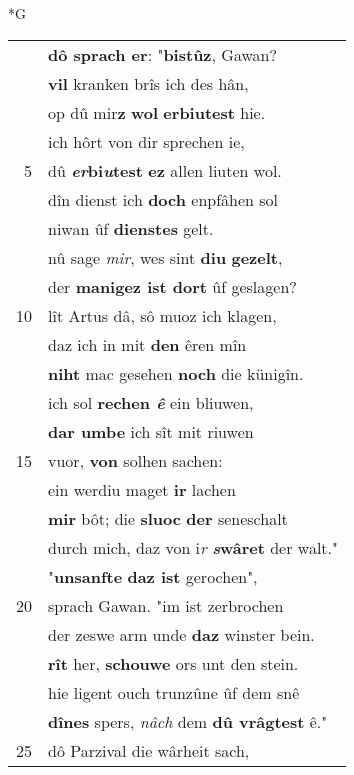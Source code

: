 \documentclass[8pt,a4paper,notitlepage]{article}
\begin{document}
\newpage
\begin{table}[ht]
\begin{minipage}[t]{0.5\linewidth}
\small
\begin{center}*G
\end{center}
\begin{tabular}{rl}
 & \textbf{dô sprach er}: "\textbf{bistûz}, Gawan?\\ 
 & \textbf{vil} kranken brîs ich des hân,\\ 
 & op dû mir\textbf{z} \textbf{wol} \textbf{erbiutest} hie.\\ 
 & ich hôrt von dir sprechen ie,\\ 
5 & dû \textbf{\textit{er}bi\textit{u}test} \textbf{ez} allen liuten wol.\\ 
 & dîn dienst ich \textbf{doch} enpfâhen sol\\ 
 & niwan ûf \textbf{dienstes} gelt.\\ 
 & nû sage \textit{mir}, wes sint \textbf{diu} \textbf{gezelt},\\ 
 & der \textbf{manigez ist dort} ûf geslagen?\\ 
10 & lît Artus dâ, sô muoz ich klagen,\\ 
 & daz ich in mit \textbf{den} êren mîn\\ 
 & \textbf{niht} mac gesehen \textbf{noch} die künigîn.\\ 
 & ich sol \textbf{rechen \textit{ê}} ein bliuwen,\\ 
 & \textbf{dar umbe} ich sît mit riuwen\\ 
15 & vuor, \textbf{von} solhen sachen:\\ 
 & ein werdiu maget \textbf{ir} lachen\\ 
 & \textbf{mir} bôt; die \textbf{sluoc} \textbf{der} seneschalt\\ 
 & durch mich, daz von i\textit{r} \textbf{\textit{s}wâret} der walt."\\ 
 & "\textbf{unsanfte} \textbf{daz ist} gerochen",\\ 
20 & sprach Gawan. "im ist zerbrochen\\ 
 & der zeswe arm unde \textbf{daz} winster bein.\\ 
 & \textbf{rît} her, \textbf{schouwe} ors unt den stein.\\ 
 & hie ligent ouch trunzûne ûf dem snê\\ 
 & \textbf{dînes} spers, \textit{nâch} dem \textbf{dû vrâgtest} ê."\\ 
25 & dô Parzival die wârheit sach,\\ 

\end{tabular}
\end{minipage}
\end{table}
\end{document}
